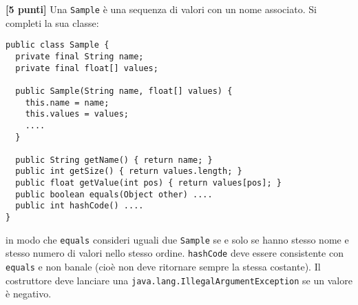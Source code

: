 \documentclass{article}[10pt]
\newcounter{esnu}
\newenvironment{esercizio}{\medskip \noindent {\bf Esercizio\addtocounter{esnu}{1} \arabic{esnu}}}{}
\begin{document}
\begin{esercizio}
\textbf{[5 punti]}
Una \texttt{Sample} \`e una sequenza di valori con un nome associato. Si completi la sua classe:

{\small
\begin{verbatim}
public class Sample {
  private final String name;
  private final float[] values;

  public Sample(String name, float[] values) {
    this.name = name;
    this.values = values;
    ....
  }

  public String getName() { return name; }
  public int getSize() { return values.length; }
  public float getValue(int pos) { return values[pos]; }
  public boolean equals(Object other) ....
  public int hashCode() ....
}
\end{verbatim}}

\noindent
in modo che \texttt{equals} consideri uguali due \texttt{Sample} se e solo se hanno stesso nome e stesso
numero di valori nello stesso ordine. \texttt{hashCode} deve essere consistente con \texttt{equals} e non banale
(cio\`e non deve ritornare sempre la stessa costante). Il costruttore deve lanciare una
\texttt{java.lang.IllegalArgumentException} se un valore \`e negativo.
\end{esercizio}
\end{document}
